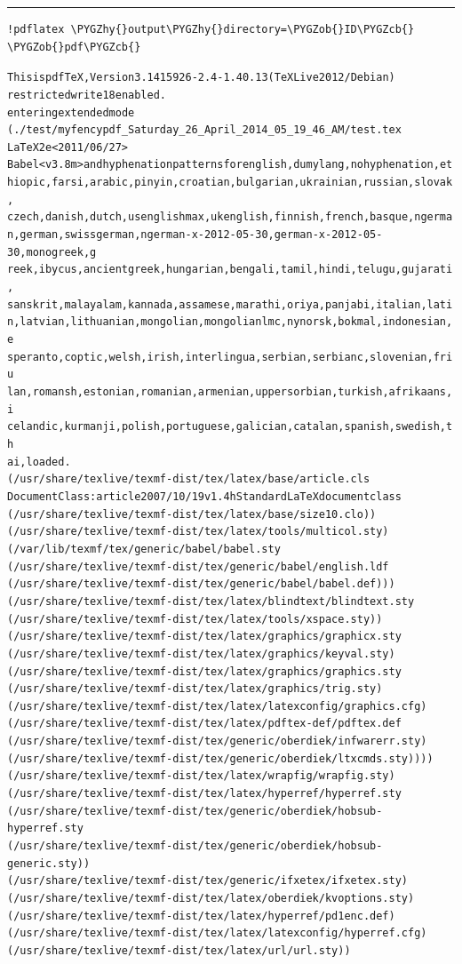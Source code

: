 \documentclass[letterpaper,10pt,english]{sphinxmanual}
\def\PYGZob{\char`\{}
\def\PYGZcb{\char`\}}
\def\PYGZhy{\char`\-}
\begin{document}
\bigskip\hrule{}\bigskip


\begin{Verbatim}[commandchars=\\\{\}]
!pdflatex \PYGZhy{}output\PYGZhy{}directory=\PYGZob{}ID\PYGZcb{} \PYGZob{}pdf\PYGZcb{}
\end{Verbatim}
\begin{alltt}
This is pdfTeX, Version 3.1415926-2.4-1.40.13 (TeX Live 2012/Debian)
 restricted write18 enabled.
entering extended mode
(./test/myfencypdf\_Saturday\_26\_April\_2014\_05\_19\_46\_AM/test.tex
LaTeX2e \textless{}2011/06/27\textgreater{}
Babel \textless{}v3.8m\textgreater{} and hyphenation patterns for english, dumylang, nohyphenation, et
hiopic, farsi, arabic, pinyin, croatian, bulgarian, ukrainian, russian, slovak,
 czech, danish, dutch, usenglishmax, ukenglish, finnish, french, basque, ngerma
n, german, swissgerman, ngerman-x-2012-05-30, german-x-2012-05-30, monogreek, g
reek, ibycus, ancientgreek, hungarian, bengali, tamil, hindi, telugu, gujarati,
 sanskrit, malayalam, kannada, assamese, marathi, oriya, panjabi, italian, lati
n, latvian, lithuanian, mongolian, mongolianlmc, nynorsk, bokmal, indonesian, e
speranto, coptic, welsh, irish, interlingua, serbian, serbianc, slovenian, friu
lan, romansh, estonian, romanian, armenian, uppersorbian, turkish, afrikaans, i
celandic, kurmanji, polish, portuguese, galician, catalan, spanish, swedish, th
ai, loaded.
(/usr/share/texlive/texmf-dist/tex/latex/base/article.cls
Document Class: article 2007/10/19 v1.4h Standard LaTeX document class
(/usr/share/texlive/texmf-dist/tex/latex/base/size10.clo))
(/usr/share/texlive/texmf-dist/tex/latex/tools/multicol.sty)
(/var/lib/texmf/tex/generic/babel/babel.sty
(/usr/share/texlive/texmf-dist/tex/generic/babel/english.ldf
(/usr/share/texlive/texmf-dist/tex/generic/babel/babel.def)))
(/usr/share/texlive/texmf-dist/tex/latex/blindtext/blindtext.sty
(/usr/share/texlive/texmf-dist/tex/latex/tools/xspace.sty))
(/usr/share/texlive/texmf-dist/tex/latex/graphics/graphicx.sty
(/usr/share/texlive/texmf-dist/tex/latex/graphics/keyval.sty)
(/usr/share/texlive/texmf-dist/tex/latex/graphics/graphics.sty
(/usr/share/texlive/texmf-dist/tex/latex/graphics/trig.sty)
(/usr/share/texlive/texmf-dist/tex/latex/latexconfig/graphics.cfg)
(/usr/share/texlive/texmf-dist/tex/latex/pdftex-def/pdftex.def
(/usr/share/texlive/texmf-dist/tex/generic/oberdiek/infwarerr.sty)
(/usr/share/texlive/texmf-dist/tex/generic/oberdiek/ltxcmds.sty))))
(/usr/share/texlive/texmf-dist/tex/latex/wrapfig/wrapfig.sty)
(/usr/share/texlive/texmf-dist/tex/latex/hyperref/hyperref.sty
(/usr/share/texlive/texmf-dist/tex/generic/oberdiek/hobsub-hyperref.sty
(/usr/share/texlive/texmf-dist/tex/generic/oberdiek/hobsub-generic.sty))
(/usr/share/texlive/texmf-dist/tex/generic/ifxetex/ifxetex.sty)
(/usr/share/texlive/texmf-dist/tex/latex/oberdiek/kvoptions.sty)
(/usr/share/texlive/texmf-dist/tex/latex/hyperref/pd1enc.def)
(/usr/share/texlive/texmf-dist/tex/latex/latexconfig/hyperref.cfg)
(/usr/share/texlive/texmf-dist/tex/latex/url/url.sty))


\end{alltt}
\end{document}
